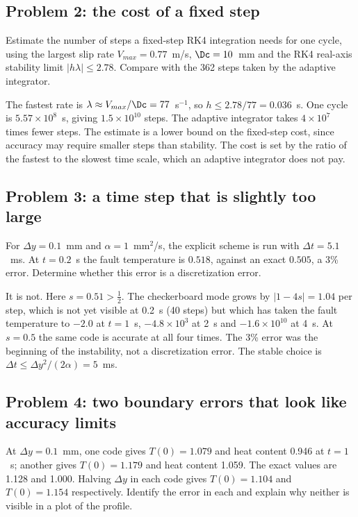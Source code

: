 \subsection*{Problem 2: the cost of a fixed step}

Estimate the number of steps a fixed-step RK4 integration needs for one cycle, using the largest slip rate $V_{max}=0.77$~m/s, $\Dc=10$~mm and the RK4 real-axis stability limit $|h\lambda|\le2.78$. Compare with the 362 steps taken by the adaptive integrator.

\solution The fastest rate is $\lambda\approx V_{max}/\Dc=77$~s$^{-1}$, so $h\le2.78/77=0.036$~s. One cycle is $5.57\times10^{8}$~s, giving $1.5\times10^{10}$ steps. The adaptive integrator takes $4\times10^{7}$ times fewer steps. The estimate is a lower bound on the fixed-step cost, since accuracy may require smaller steps than stability. The cost is set by the ratio of the fastest to the slowest time scale, which an adaptive integrator does not pay.

\subsection*{Problem 3: a time step that is slightly too large}

For $\Delta y=0.1$~mm and $\alpha=1$~mm$^2$/s, the explicit scheme is run with $\Delta t=5.1$~ms. At $t=0.2$~s the fault temperature is $0.518$, against an exact $0.505$, a 3\% error. Determine whether this error is a discretization error.

\solution It is not. Here $s=0.51>\tfrac12$. The checkerboard mode grows by $|1-4s|=1.04$ per step, which is not yet visible at 0.2~s (40 steps) but which has taken the fault temperature to $-2.0$ at $t=1$~s, $-4.8\times10^3$ at 2~s and $-1.6\times10^{10}$ at 4~s. At $s=0.5$ the same code is accurate at all four times. The 3\% error was the beginning of the instability, not a discretization error. The stable choice is $\Delta t\le\Delta y^2/(2\alpha)=5$~ms.

\subsection*{Problem 4: two boundary errors that look like accuracy limits}

At $\Delta y=0.1$~mm, one code gives $T(0)=1.079$ and heat content 0.946 at $t=1$~s; another gives $T(0)=1.179$ and heat content 1.059. The exact values are 1.128 and 1.000. Halving $\Delta y$ in each code gives $T(0)=1.104$ and $T(0)=1.154$ respectively. Identify the error in each and explain why neither is visible in a plot of the profile.

